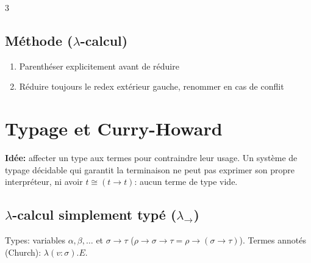 \documentclass[12pt, a4paper]{article}
\begin{document}
\begin{multicols*}{3}
	\subsection{Méthode ($\lambda$-calcul)}
	\begin{enumerate}[\roman*.]
		\item Parenthéser explicitement avant de réduire
		\item Réduire toujours le redex extérieur gauche, renommer en cas de conflit
	\end{enumerate}

	\colbreak
	\section{Typage et Curry-Howard}
	\textbf{Idée:} affecter un type aux termes pour contraindre leur usage. Un système de typage décidable qui garantit la terminaison ne peut pas exprimer son propre interpréteur, ni avoir $t\cong(t\to t)$: aucun terme de type vide.

	\subsection{$\lambda$-calcul simplement typé ($\lambda_\to$)}
	Types: variables $\alpha,\beta,\dots$ et $\sigma\to\tau$ ($\rho\to\sigma\to\tau=\rho\to(\sigma\to\tau)$). Termes annotés (Church): $\lambda(v:\sigma).E$.


\end{multicols*}
\end{document}
